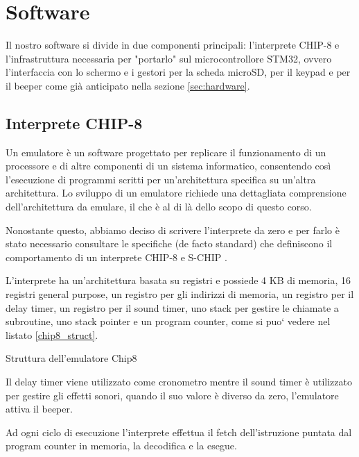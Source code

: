 \documentclass[a4paper]{article}
\begin{document}
\section{Software}

Il nostro software si divide in due componenti principali: l'interprete CHIP-8 e l'infrastruttura necessaria per "portarlo" sul microcontrollore STM32, ovvero l'interfaccia con lo schermo e i gestori per la scheda microSD, per il keypad e per il beeper come già anticipato nella sezione \ref{sec:hardware}.

\subsection{Interprete CHIP-8}

Un emulatore è un software progettato per replicare il funzionamento di un processore e di altre componenti di un sistema informatico, consentendo così l'esecuzione di programmi scritti per un'architettura specifica su un'altra architettura. Lo sviluppo di un emulatore richiede una dettagliata comprensione dell'architettura da emulare, il che è al di là dello scopo di questo corso.

Nonostante questo, abbiamo deciso di scrivere l'interprete da zero e per farlo è stato necessario consultare le specifiche (de facto standard) che definiscono il comportamento di un interprete CHIP-8 \cite{cowgod:chip8} e S-CHIP \cite{cowgod:schip}.

L'interprete ha un'architettura basata su registri e possiede 4 KB di memoria, 16 registri general purpose, un registro per gli indirizzi di memoria, un registro per il delay timer, un registro per il sound timer, uno stack per gestire le chiamate a subroutine, uno stack pointer e un program counter, come si puo` vedere nel listato \ref{chip8_struct}.

\begin{Listing}[h!t] %
    \centering
    \caption{Struttura dell'emulatore Chip8}
    \label{chip8_struct}
\end{Listing}

Il delay timer viene utilizzato come cronometro mentre il sound
timer è utilizzato per gestire gli effetti sonori, quando il suo
valore è diverso da zero, l'emulatore attiva il beeper.

Ad ogni ciclo di esecuzione l'interprete effettua il fetch
dell'istruzione puntata dal program counter in memoria,
la decodifica e la esegue.
\end{document}

